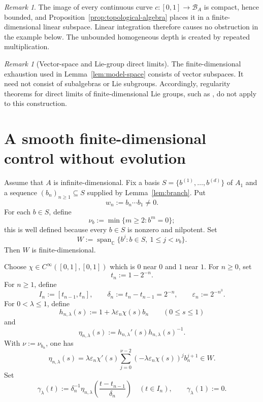 \documentclass[11pt]{article}
\theoremstyle{remark}
\newtheorem{remark}[theorem]{Remark}
\begin{document}
\begin{remark}
\label{rem:finite-range}
The image of every continuous curve $c:[0,1]\to\mathcal B_A$ is compact,
hence bounded, and Proposition~\ref{prop:topological-algebra} places it in a
finite-dimensional linear subspace.  Linear integration therefore causes no
obstruction in the example below.  The unbounded homogeneous depth is created
by repeated multiplication.
\end{remark}

\begin{remark}[Vector-space and Lie-group direct limits]
The finite-dimensional exhaustion used in Lemma~\ref{lem:model-space} consists
of vector subspaces.  It need not consist of subalgebras or Lie subgroups.
Accordingly, regularity theorems for direct limits of finite-dimensional Lie
groups, such as \cite{GlocknerDirectLimits2021}, do not apply to this
construction.
\end{remark}

\section{A smooth finite-dimensional control without evolution}
\label{sec:control}

Assume that $A$ is infinite-dimensional.  Fix a basis
$S=\{b^{(1)},\ldots,b^{(d)}\}$ of $A_1$ and a sequence
$(b_n)_{n\geq1}\subseteq S$ supplied by Lemma~\ref{lem:branch}.  Put
\[
  w_n:=b_n\cdots b_1\neq0.
\]
For each $b\in S$, define
\[
  \nu_b:=\min\{m\geq2:b^m=0\};
\]
this is well defined because every $b\in S$ is nonzero and nilpotent.  Set
\begin{equation}
  W:=\operatorname{span}_{\mathbb C}
  \{b^j:b\in S,\ 1\leq j<\nu_b\}.
  \label{eq:control-space}
\end{equation}
Then $W$ is finite-dimensional.

Choose $\chi\in C^\infty([0,1],[0,1])$ which is $0$ near $0$ and $1$ near
$1$.  For $n\geq0$, set
\[
  t_n:=1-2^{-n}.
\]
For $n\geq1$, define
\[
  I_n:=[t_{n-1},t_n],
  \qquad
  \delta_n:=t_n-t_{n-1}=2^{-n},
  \qquad
  \varepsilon_n:=2^{-n^3}.
\]
For $0<\lambda\leq1$, define
\[
  h_{n,\lambda}(s):=1+\lambda\varepsilon_n\chi(s)b_n
  \qquad(0\leq s\leq1)
\]
and
\[
  \eta_{n,\lambda}(s):=
  h_{n,\lambda}'(s)h_{n,\lambda}(s)^{-1}.
\]
With $\nu:=\nu_{b_n}$, one has
\begin{equation}
  \eta_{n,\lambda}(s)
  =\lambda\varepsilon_n\chi'(s)
   \sum_{j=0}^{\nu-2}
   (-\lambda\varepsilon_n\chi(s))^j b_n^{j+1}
  \in W.
  \label{eq:eta-expansion}
\end{equation}
Set
\begin{equation}
  \gamma_\lambda(t):=
  \delta_n^{-1}\eta_{n,\lambda}
  \left(\frac{t-t_{n-1}}{\delta_n}\right)
  \quad(t\in I_n),
  \qquad
  \gamma_\lambda(1):=0.
  \label{eq:gamma-definition}
\end{equation}
\end{document}
